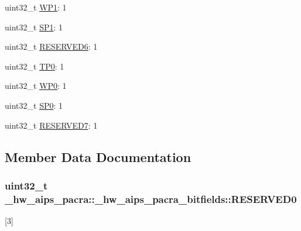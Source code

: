 \begin{DoxyCompactItemize}
\item 
uint32\+\_\+t \hyperlink{struct__hw__aips__pacra_1_1__hw__aips__pacra__bitfields_a1edaa43a963ec7be379aff52f4a6b36e}{W\+P1}\+: 1
\item 
uint32\+\_\+t \hyperlink{struct__hw__aips__pacra_1_1__hw__aips__pacra__bitfields_addb83546ee4903a54653ca7020a46444}{S\+P1}\+: 1
\item 
uint32\+\_\+t \hyperlink{struct__hw__aips__pacra_1_1__hw__aips__pacra__bitfields_ac2a8d7432598477b2f64299c8fae79b8}{R\+E\+S\+E\+R\+V\+E\+D6}\+: 1
\item 
uint32\+\_\+t \hyperlink{struct__hw__aips__pacra_1_1__hw__aips__pacra__bitfields_aae0836a30392cfff2161758e9b006d0d}{T\+P0}\+: 1
\item 
uint32\+\_\+t \hyperlink{struct__hw__aips__pacra_1_1__hw__aips__pacra__bitfields_a3b4ed12d4ddcc01a4bc54ffece0b446f}{W\+P0}\+: 1
\item 
uint32\+\_\+t \hyperlink{struct__hw__aips__pacra_1_1__hw__aips__pacra__bitfields_abb79bf33eab126589d8247f3e3191774}{S\+P0}\+: 1
\item 
uint32\+\_\+t \hyperlink{struct__hw__aips__pacra_1_1__hw__aips__pacra__bitfields_a82eb1fe11f6c0ad7df0236bc2d1aff3d}{R\+E\+S\+E\+R\+V\+E\+D7}\+: 1
\end{DoxyCompactItemize}


\subsection{Member Data Documentation}
\subsubsection[{\texorpdfstring{R\+E\+S\+E\+R\+V\+E\+D0}{RESERVED0}}]{\setlength{\rightskip}{0pt plus 5cm}uint32\+\_\+t \+\_\+hw\+\_\+aips\+\_\+pacra\+::\+\_\+hw\+\_\+aips\+\_\+pacra\+\_\+bitfields\+::\+R\+E\+S\+E\+R\+V\+E\+D0}\hypertarget{struct__hw__aips__pacra_1_1__hw__aips__pacra__bitfields_a815228723079bee2e9951bad792297de}{}\label{struct__hw__aips__pacra_1_1__hw__aips__pacra__bitfields_a815228723079bee2e9951bad792297de}
\mbox{[}3\mbox{]} 
